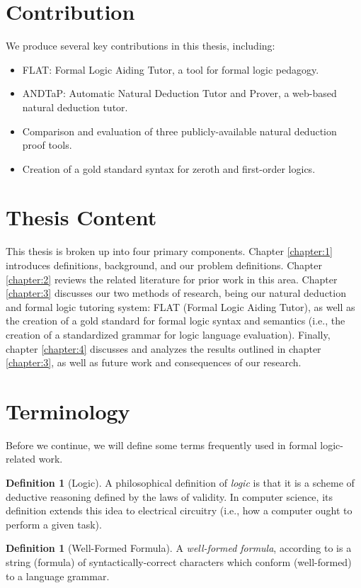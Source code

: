 \documentclass[ms]{uncgdissertationexp2}
\theoremstyle{plain}
\theoremstyle{definition}
\newtheorem{definition}[theorem]{Definition}
\theoremstyle{remark}
\begin{document}
\section{Contribution}
We produce several key contributions in this thesis, including:
\begin{itemize}
    \item FLAT: Formal Logic Aiding Tutor, a tool for formal logic pedagogy.
    \item ANDTaP: Automatic Natural Deduction Tutor and Prover, a web-based natural deduction tutor.
    \item Comparison and evaluation of three publicly-available natural deduction proof tools.
    \item Creation of a gold standard syntax for zeroth and first-order logics.
\end{itemize}
\section{Thesis Content}
This thesis is broken up into four primary components. Chapter \ref{chapter:1} introduces definitions, background, and our problem definitions. Chapter \ref{chapter:2} reviews the related literature for prior work in this area. Chapter \ref{chapter:3} discusses our two methods of research, being our natural deduction and formal logic tutoring system: FLAT (Formal Logic Aiding Tutor), as well as the creation of a gold standard for formal logic syntax and semantics (i.e., the creation of a standardized grammar for logic language evaluation). Finally, chapter \ref{chapter:4} discusses and analyzes the results outlined in chapter \ref{chapter:3}, as well as future work and consequences of our research.
\section{Terminology}
Before we continue, we will define some terms frequently used in formal logic-related work.
\begin{definition}[Logic]
	A philosophical definition of \textit{logic} is that it is a scheme of deductive reasoning defined by the laws of validity. In computer science, its definition extends this idea to electrical circuitry (i.e., how a computer ought to perform a given task).
\end{definition}

\begin{definition}[Well-Formed Formula]
	A \textit{well-formed formula}, according to \cite{encyclopedia} is a string (formula) of syntactically-correct characters which conform (well-formed) to a language grammar.
\end{definition}
    
\end{document}

